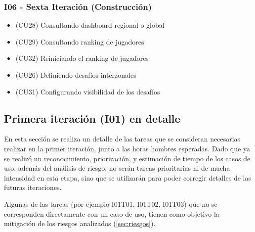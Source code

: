 \subsubsection{I06 - Sexta Iteración (Construcción)}
\begin{itemize}
\item (CU28) Consultando dashboard regional o global
\item (CU29) Consultando ranking de jugadores
\item (CU32) Reiniciando el ranking de jugadores
\item (CU26) Definiendo desafíos interzonales
\item (CU31) Configurando visibilidad de los desafíos
\end{itemize}


\subsection{Primera iteración (I01) en detalle}
\label{subsec:primeraiteracion}
En esta sección se realiza un detalle de las tareas que se consideran necesarias realizar en la primer iteración, junto a las horas hombres esperadas. Dado que ya se realizó un reconocimiento, priorización, y estimación de tiempo de los casos de uso, además del análisis de riesgo, no serán tareas prioritarias ni de mucha intensidad en esta etapa, sino que se utilizarán para poder corregir detalles de las futuras iteraciones.

Algunas de las tareas (por ejemplo I01T01, I01T02, I01T03) que no se corresponden directamente con un caso de uso, tienen como objetivo la mitigación de los riesgos analizados (\ref{sec:riesgos}).

